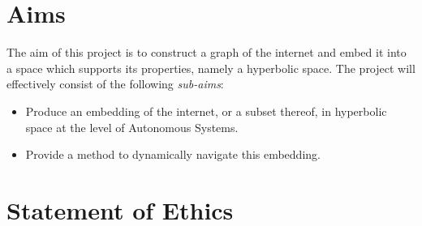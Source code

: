 \section{Aims}
\label{sec:aims}

The aim of this project is to construct a graph of the internet and embed it into a space which supports its properties, namely a hyperbolic space. The project will effectively consist of the following \textit{sub-aims}:

\begin{itemize}
	\item{Produce an embedding of the internet, or a subset thereof, in hyperbolic space at the level of Autonomous Systems.}
	\item{Provide a method to dynamically navigate this embedding.}
\end{itemize}

\section{Statement of Ethics}
